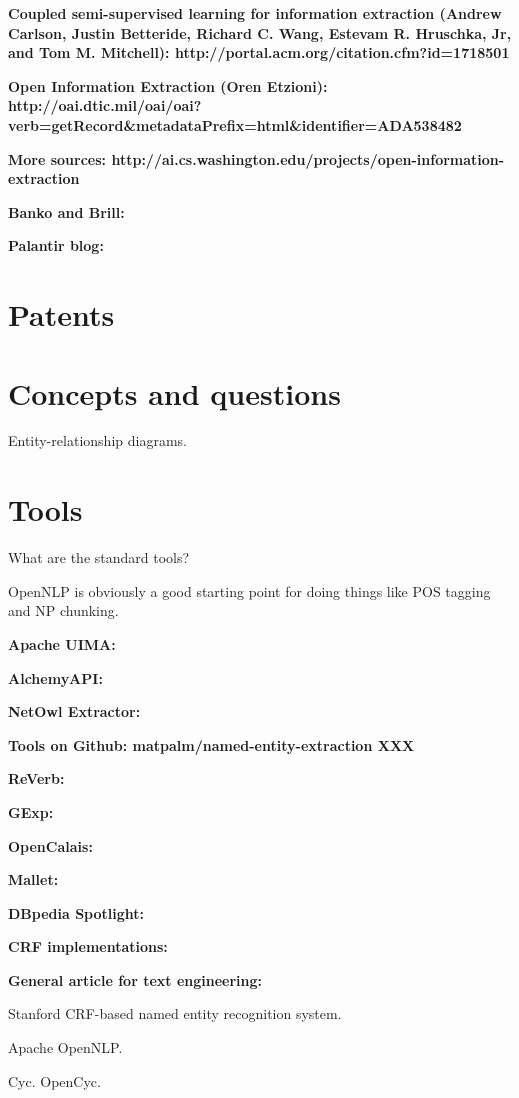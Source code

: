 \textbf{Coupled semi-supervised learning for information extraction (Andrew
Carlson, Justin Betteride, Richard C. Wang, Estevam R. Hruschka, Jr,
and Tom M. Mitchell): http://portal.acm.org/citation.cfm?id=1718501}

\textbf{Open Information Extraction (Oren Etzioni):
http://oai.dtic.mil/oai/oai?verb=getRecord\&metadataPrefix=html\&identifier=ADA538482}

\textbf{More sources: http://ai.cs.washington.edu/projects/open-information-extraction}

\textbf{Banko and Brill:}

\textbf{Palantir blog:}

\section{Patents}


\section{Concepts and questions} 

Entity-relationship diagrams.

\section{Tools}

What are the standard tools?

OpenNLP is obviously a good starting point for doing things like POS
tagging and NP chunking.

\textbf{Apache UIMA:}

\textbf{AlchemyAPI:}

\textbf{NetOwl Extractor:}

\textbf{Tools on Github: matpalm/named-entity-extraction XXX}

\textbf{ReVerb:}

\textbf{GExp:}

\textbf{OpenCalais:}

\textbf{Mallet:}

\textbf{DBpedia Spotlight:}

\textbf{CRF implementations:}

\textbf{General article for text engineering:}

Stanford CRF-based named entity recognition system.

Apache OpenNLP.

Cyc.  OpenCyc.

